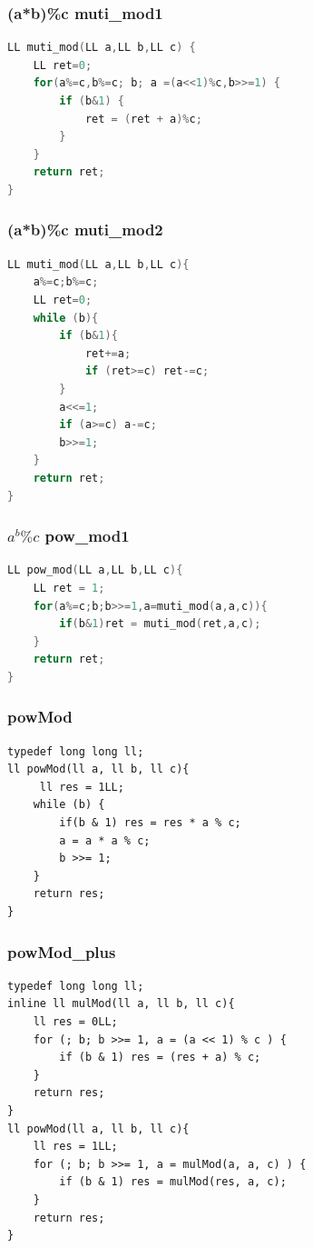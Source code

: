 \documentclass[a4paper]{article}
\begin{document}
\begin{CJK*}{UTF8}{gbsn}
\begin{multicols}{3}
\begin{flushleft}
\subsubsection{(a*b)\%c  muti\_mod1}
\begin{lstlisting}[language={c++}]
LL muti_mod(LL a,LL b,LL c) {
    LL ret=0;
    for(a%=c,b%=c; b; a =(a<<1)%c,b>>=1) {
        if (b&1) {
            ret = (ret + a)%c;
        }
    }
    return ret;
}
\end{lstlisting}

\subsubsection{(a*b)\%c  muti\_mod2}
\begin{lstlisting}[language={c++}]
LL muti_mod(LL a,LL b,LL c){        
	a%=c;b%=c;
    LL ret=0;
    while (b){
        if (b&1){
            ret+=a;
            if (ret>=c) ret-=c;
        }
        a<<=1;
        if (a>=c) a-=c;
        b>>=1;
    }
    return ret;
}
\end{lstlisting}

\subsubsection{$a^b\%c$ pow\_mod1}
\begin{lstlisting}[language={c++}]
LL pow_mod(LL a,LL b,LL c){
	LL ret = 1;
	for(a%=c;b;b>>=1,a=muti_mod(a,a,c)){
        if(b&1)ret = muti_mod(ret,a,c);
	}
	return ret;
}
\end{lstlisting}

\subsubsection{powMod}
\begin{lstlisting}
typedef long long ll;
ll powMod(ll a, ll b, ll c){
	 ll res = 1LL;
	while (b) {
		if(b & 1) res = res * a % c;
		a = a * a % c;
		b >>= 1;
	}
	return res;
}
\end{lstlisting}

\subsubsection{powMod\_plus}
\begin{lstlisting}
typedef long long ll;
inline ll mulMod(ll a, ll b, ll c){
	ll res = 0LL;
	for (; b; b >>= 1, a = (a << 1) % c ) {
		if (b & 1) res = (res + a) % c;
	}
	return res;
}
ll powMod(ll a, ll b, ll c){
	ll res = 1LL;
	for (; b; b >>= 1, a = mulMod(a, a, c) ) {
		if (b & 1) res = mulMod(res, a, c);
	}
	return res;
}
\end{lstlisting}


\end{flushleft}
\end{multicols}
\end{CJK*}
\end{document}
